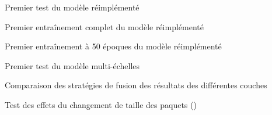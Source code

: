 \begin{report}{Premier test du modèle réimplémenté}\label{subsec:testreimp_1}
	
\end{report}
\begin{report}{Premier entraînement complet du modèle réimplémenté}\label{subsec:testreimp_2}
	
\end{report}
\begin{report}{Premier entraînement à 50 époques du modèle réimplémenté}\label{subsec:testreimp_3}
	
\end{report}
\begin{report}{Premier test du modèle multi-échelles}\label{subsec:testms}
	
\end{report}
\begin{report}{Comparaison des stratégies de fusion des résultats des différentes couches}\label{subsec:addcat}
	
\end{report}
\begin{report}{Test des effets du changement de taille des paquets ()}\label{subsec:batch_1}
	
\end{report}


